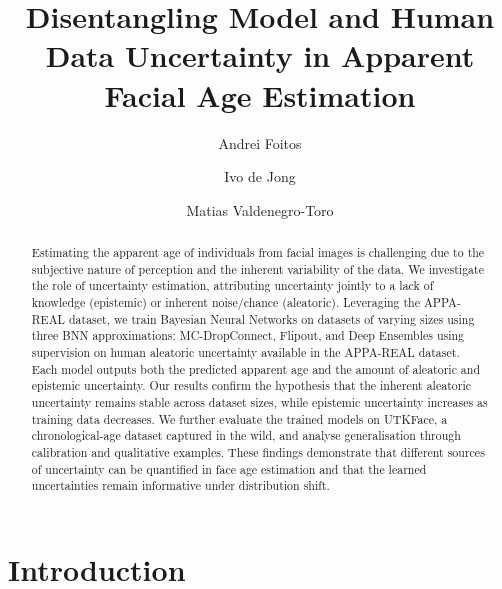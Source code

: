 \documentclass[runningheads]{llncs}
\begin{document}
\title{Disentangling Model and Human Data Uncertainty in Apparent Facial Age Estimation}


\author{Andrei Foitos \and
Ivo de Jong \and
Matias Valdenegro-Toro}



\maketitle

\begin{abstract}
Estimating the apparent age of individuals from facial images is challenging due to the subjective nature of perception and the inherent variability of the data. We investigate the role of uncertainty estimation, attributing uncertainty jointly to a lack of knowledge (epistemic) or inherent noise/chance (aleatoric). Leveraging the APPA-REAL dataset, we train Bayesian Neural Networks on datasets of varying sizes using three BNN approximations: MC-DropConnect, Flipout, and Deep Ensembles using supervision on human aleatoric uncertainty available in the APPA-REAL dataset. Each model outputs both the predicted apparent age and the amount of aleatoric and epistemic uncertainty. Our results confirm the hypothesis that the inherent aleatoric uncertainty remains stable across dataset sizes, while epistemic uncertainty increases as training data decreases. We further evaluate the trained models on UTKFace, a chronological-age dataset captured in the wild, and analyse generalisation through calibration and qualitative examples. These findings demonstrate that different sources of uncertainty can be quantified in face age estimation and that the learned uncertainties remain informative under distribution shift.

\end{abstract}

\section{Introduction}
\label{sec:intro}
\end{document}
